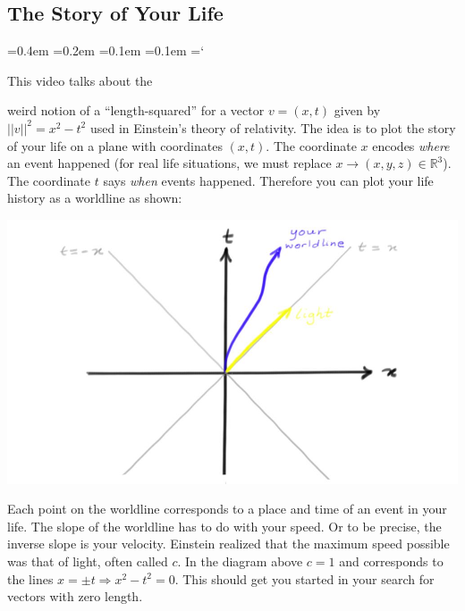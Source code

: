 
\subsection*{The Story of Your Life}

{\ttfamily
{}\font=0.4em
\font=0.2em
\font=0.1em
\font=0.1em
\hyphenchar\font=`\-


\hypertarget{vectors_in_space_n_vectors_hint}{This video talks about the} weird notion of
a ``length-squared'' for a vector $v=(x,t)$ given by $||v||^2=x^2-t^2$ used in Einstein's theory of relativity.
The idea is to plot the story of your life on a plane with coordinates $(x,t)$. The coordinate $x$ encodes
{\it where} an event happened (for real life situations, we must replace $x\to (x,y,z)\in {\mathbb R}^3$). 
The coordinate $t$ says {\it when} events happened. Therefore you can plot your life history as a worldline
as shown:
\begin{center}
\includegraphics[scale=.2]{worldline.jpg}
\end{center}
Each point on the worldline  corresponds to a place and time of an event in your life. The slope of
the worldline has to do with your speed. Or to be precise, the inverse slope is your velocity. 
Einstein realized that the maximum speed possible was that of light, often called $c$. In the diagram above
$c=1$ and corresponds to the lines $x=\pm t\Rightarrow x^2-t^2=0$. This should get you started in your search for vectors
with zero length.




}

